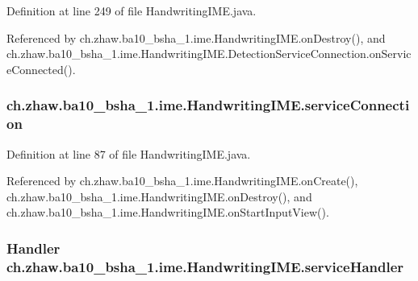 Definition at line 249 of file HandwritingIME.java.

Referenced by ch.zhaw.ba10\_\-bsha\_\-1.ime.HandwritingIME.onDestroy(), and ch.zhaw.ba10\_\-bsha\_\-1.ime.HandwritingIME.DetectionServiceConnection.onServiceConnected().\hypertarget{classch_1_1zhaw_1_1ba10__bsha__1_1_1ime_1_1HandwritingIME_a327839f818f5782ff037e64ff386045f}{
\subsubsection[{serviceConnection}]{ {\bf ch.zhaw.ba10\_\-bsha\_\-1.ime.HandwritingIME.serviceConnection}}}
\label{classch_1_1zhaw_1_1ba10__bsha__1_1_1ime_1_1HandwritingIME_a327839f818f5782ff037e64ff386045f}


Definition at line 87 of file HandwritingIME.java.

Referenced by ch.zhaw.ba10\_\-bsha\_\-1.ime.HandwritingIME.onCreate(), ch.zhaw.ba10\_\-bsha\_\-1.ime.HandwritingIME.onDestroy(), and ch.zhaw.ba10\_\-bsha\_\-1.ime.HandwritingIME.onStartInputView().\hypertarget{classch_1_1zhaw_1_1ba10__bsha__1_1_1ime_1_1HandwritingIME_a3c53e6e79323d1574d50d493d76f290d}{
\subsubsection[{serviceHandler}]{\setlength{\rightskip}{0pt plus 5cm}Handler {\bf ch.zhaw.ba10\_\-bsha\_\-1.ime.HandwritingIME.serviceHandler}}}
\label{classch_1_1zhaw_1_1ba10__bsha__1_1_1ime_1_1HandwritingIME_a3c53e6e79323d1574d50d493d76f290d}


